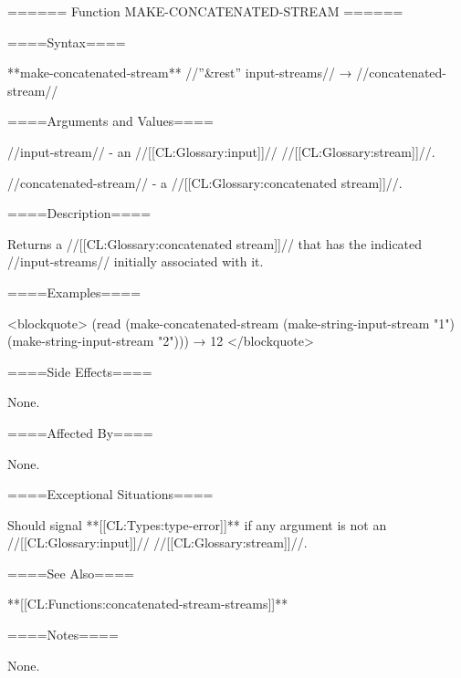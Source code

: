 ====== Function MAKE-CONCATENATED-STREAM ======

====Syntax====

**make-concatenated-stream** //''&rest'' input-streams// → //concatenated-stream//

====Arguments and Values====

//input-stream// - an //[[CL:Glossary:input]]// //[[CL:Glossary:stream]]//.

//concatenated-stream// - a //[[CL:Glossary:concatenated stream]]//.

====Description====

Returns a //[[CL:Glossary:concatenated stream]]// that has the indicated //input-streams// initially associated with it.

====Examples====

<blockquote> (read (make-concatenated-stream (make-string-input-stream "1") (make-string-input-stream "2"))) → 12 </blockquote>

====Side Effects====

None.

====Affected By====

None.

====Exceptional Situations====

Should signal **[[CL:Types:type-error]]** if any argument is not an //[[CL:Glossary:input]]// //[[CL:Glossary:stream]]//.

====See Also====

**[[CL:Functions:concatenated-stream-streams]]**

====Notes====

None.

